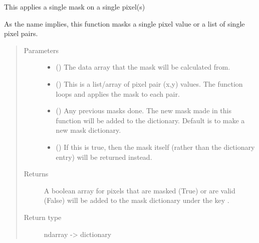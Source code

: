 \documentclass[letterpaper,10pt,english]{sphinxmanual}
\begin{document}
\begin{fulllineitems}
\label{\detokenize{python_docstrings/IfA_Smeargle.echo.masks.masks_echo300:IfA_Smeargle.echo.masks.masks_echo300.echo380_single_pixels}}
This applies a single mask on a single pixel(s)

As the name implies, this function masks a single pixel value or a list
of single pixel pairs.
\begin{quote}\begin{description}
\item[{Parameters}] \leavevmode\begin{itemize}
\item {} 
 () \textendash{} The data array that the mask will be calculated from.

\item {} 
 (\sphinxstyleliteralemphasis{\sphinxupquote{, }}) \textendash{} This is a list/array of pixel pair (x,y) values. The function loops
and applies the mask to each pair.

\item {} 
 (\sphinxstyleliteralemphasis{\sphinxupquote{ (}}\sphinxstyleliteralemphasis{\sphinxupquote{)}}) \textendash{} Any previous masks done. The new mask made in this function will be
added to the dictionary. Default is to make a new mask dictionary.

\item {} 
 (\sphinxstyleliteralemphasis{\sphinxupquote{ (}}\sphinxstyleliteralemphasis{\sphinxupquote{)}}) \textendash{} If this is true, then the mask itself (rather than the dictionary
entry) will be returned instead.

\end{itemize}

\item[{Returns}] \leavevmode
{} \textendash{} A boolean array for pixels that are masked (True) or are valid
(False) will be added to the mask dictionary under the
key .

\item[{Return type}] \leavevmode
ndarray -\textgreater{} dictionary

\end{description}\end{quote}

\end{fulllineitems}
\end{document}
